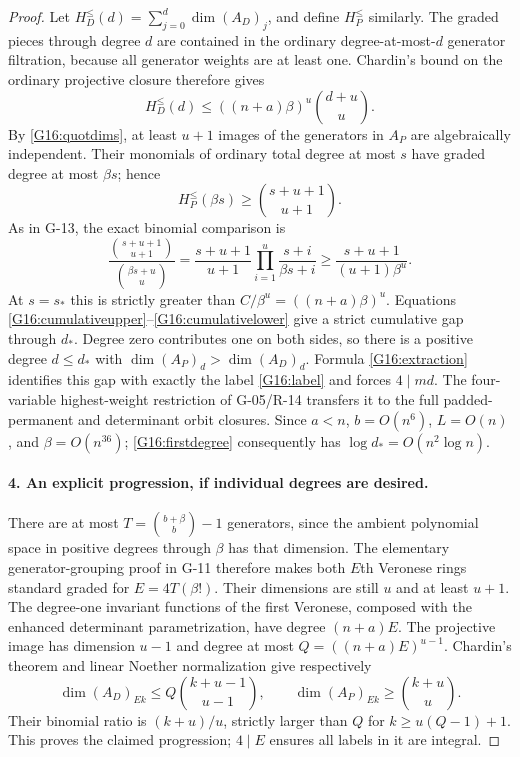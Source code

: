 \begin{proof}
Let $H_D^{\leq}(d)=\sum_{j=0}^d\dim(A_D)_j$, and define
$H_P^{\leq}$ similarly. The graded pieces through degree $d$
are contained in the ordinary degree-at-most-$d$ generator filtration,
because all generator weights are at least one. Chardin's bound on
the ordinary projective closure therefore gives
\begin{equation}\label{G16:cumulativeupper}
 H_D^{\leq}(d)\leq((n+a)\beta)^u\binom{d+u}{u}.
\end{equation}
By \eqref{G16:quotdims}, at least $u+1$ images of the generators in
$A_P$ are algebraically independent. Their monomials of ordinary
total degree at most $s$ have graded degree at most $\beta s$;
hence
\begin{equation}\label{G16:cumulativelower}
 H_P^{\leq}(\beta s)\geq\binom{s+u+1}{u+1}.
\end{equation}
As in G-13, the exact binomial comparison is
\[
 \frac{\binom{s+u+1}{u+1}}{\binom{\beta s+u}{u}}
 =\frac{s+u+1}{u+1}\prod_{i=1}^u\frac{s+i}{\beta s+i}
 \geq\frac{s+u+1}{(u+1)\beta^u}.
\]
At $s=s_*$ this is strictly greater than
$C/\beta^u=((n+a)\beta)^u$. Equations
\eqref{G16:cumulativeupper}--\eqref{G16:cumulativelower} give a
strict cumulative gap through $d_*$. Degree zero contributes one
on both sides, so there is a positive degree $d\leq d_*$ with
$\dim(A_P)_d>\dim(A_D)_d$.
Formula \eqref{G16:extraction} identifies this gap with exactly the
label \eqref{G16:label} and forces $4\mid md$.
The four-variable highest-weight restriction of G-05/R-14 transfers
it to the full padded-permanent and determinant orbit closures.
Since $a<n$, $b=O(n^6)$, $L=O(n)$, and $\beta=O(n^{36})$;
\eqref{G16:firstdegree} consequently has
$\log d_*=O(n^2\log n)$.

\paragraph{4. An explicit progression, if individual degrees are desired.}
There are at most $T=\binom{b+\beta}{b}-1$ generators, since the
ambient polynomial space in positive degrees through $\beta$ has
that dimension. The elementary generator-grouping proof in G-11
therefore makes both $E$th Veronese rings standard graded for
$E=4T(\beta!)$. Their dimensions are still $u$ and at least $u+1$.
The degree-one invariant functions of the first Veronese, composed
with the enhanced determinant parametrization, have degree
$(n+a)E$. The projective image has dimension $u-1$ and degree at
most $Q=((n+a)E)^{u-1}$.
Chardin's theorem and linear Noether normalization give respectively
\[
 \dim(A_D)_{Ek}\leq Q\binom{k+u-1}{u-1},\qquad
 \dim(A_P)_{Ek}\geq\binom{k+u}{u}.
\]
Their binomial ratio is $(k+u)/u$, strictly larger than $Q$ for
$k\geq u(Q-1)+1$. This proves the claimed progression; $4\mid E$
ensures all labels in it are integral.
\end{proof}

